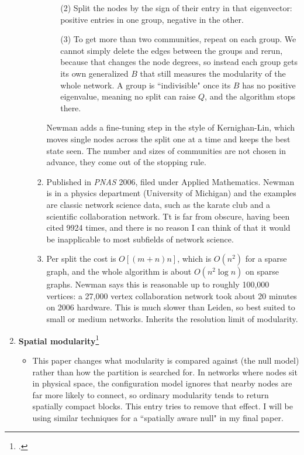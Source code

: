 \documentclass{article}
\newcommand{\nc}[1]{(#1)}
\begin{document}
\begin{enumerate}
\begin{itemize}
\begin{enumerate}
\begin{enumerate}
                \item [\nc 2] Split the nodes by the sign of their entry in that eigenvector: positive entries in one group, negative in the other.
                \item [\nc 3] To get more than two communities, repeat on each group. We cannot simply delete the edges between the groups and rerun, because that changes the node degrees, so instead each group gets its own generalized $B$ that still measures the modularity of the whole network. A group is ``indivisible" once its $B$ has no positive eigenvalue, meaning no split can raise $Q$, and the algorithm stops there.
            \end{enumerate}
            Newman adds a fine-tuning step in the style of Kernighan-Lin, which moves single nodes across the split one at a time and keeps the best state seen. The number and sizes of communities are not chosen in advance, they come out of the stopping rule.
            \item Published in \textit{PNAS} 2006, filed under Applied Mathematics. Newman is in a physics department (University of Michigan) and the examples are classic network science data, such as the karate club and a scientific collaboration network. Tt is far from obscure, having been cited 9924 times, and there is no reason I can think of that it would be inapplicable to most subfields of network science. 
            \item Per split the cost is $O[(m+n)n]$, which is $O(n^2)$ for a sparse graph, and the whole algorithm is about $O(n^2 \log n)$ on sparse graphs. Newman says this is reasonable up to roughly 100,000 vertices: a 27,000 vertex collaboration network took about 20 minutes on 2006 hardware. This is much slower than Leiden, so best suited to small or medium networks. Inherits the resolution limit of modularity.
        \end{enumerate}
    \end{itemize}
    \item \textbf{Spatial modularity}\footcite{expert2011spatial}
    \begin{itemize}
        \item This paper changes what modularity is compared against (the null model) rather than how the partition is searched for. In networks where nodes sit in physical space, the configuration model ignores that nearby nodes are far more likely to connect, so ordinary modularity tends to return spatially compact blocks. This entry tries to remove that effect. I will be using similar techniques for a ``spatially aware null" in my final paper. 

\end{itemize}
\end{enumerate}
\end{document}
